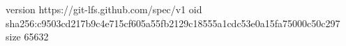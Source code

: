 version https://git-lfs.github.com/spec/v1
oid sha256:c9503cd217b9c4e715cf605a55fb2129c18555a1cdc53e0a15fa75000c50c297
size 65632
